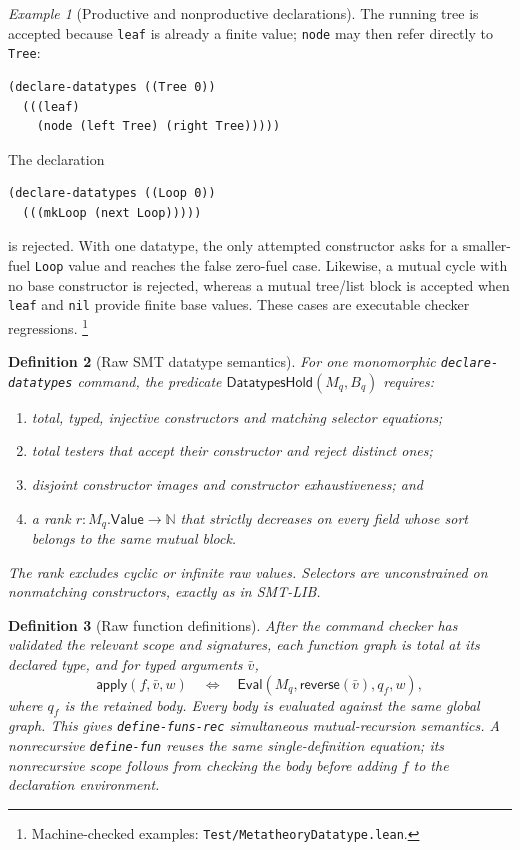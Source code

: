 \documentclass[11pt]{article}
\newtheorem{definition}{Definition}[section]
\theoremstyle{remark}
\newtheorem{example}[definition]{Example}
\begin{document}
\begin{example}[Productive and nonproductive declarations]
The running tree is accepted because \texttt{leaf} is already a finite value;
\texttt{node} may then refer directly to \texttt{Tree}:
\begin{verbatim}
(declare-datatypes ((Tree 0))
  (((leaf)
    (node (left Tree) (right Tree)))))
\end{verbatim}
The declaration
\begin{verbatim}
(declare-datatypes ((Loop 0))
  (((mkLoop (next Loop)))))
\end{verbatim}
is rejected. With one datatype, the only attempted constructor asks for a
smaller-fuel \texttt{Loop} value and reaches the false zero-fuel case. Likewise,
a mutual cycle with no base constructor is rejected, whereas a mutual
tree/list block is accepted when \texttt{leaf} and \texttt{nil} provide finite
base values. These cases are executable checker regressions.
\footnote{Machine-checked examples:
\texttt{Test/MetatheoryDatatype.lean}.}
\end{example}

\begin{definition}[Raw SMT datatype semantics]
For one monomorphic \texttt{declare-datatypes} command, the predicate
$\mathsf{DatatypesHold}(M_q,B_q)$ requires:
\begin{enumerate}[leftmargin=*]
 \item total, typed, injective constructors and matching selector equations;
 \item total testers that accept their constructor and reject distinct ones;
 \item disjoint constructor images and constructor exhaustiveness; and
 \item a rank $r:M_q.\mathsf{Value}\to\mathbb N$ that strictly decreases on
       every field whose sort belongs to the same mutual block.
\end{enumerate}
The rank excludes cyclic or infinite raw values. Selectors are unconstrained on
nonmatching constructors, exactly as in SMT-LIB.
\end{definition}

\begin{definition}[Raw function definitions]
After the command checker has validated the relevant scope and signatures, each
function graph is total at its declared type, and for
typed arguments $\bar v$,
\[
 \mathsf{apply}(f,\bar v,w)
 \quad\Longleftrightarrow\quad
 \mathsf{Eval}(M_q,\mathsf{reverse}(\bar v),q_f,w),
\]
where $q_f$ is the retained body. Every body is evaluated against the same
global graph. This gives \texttt{define-funs-rec} simultaneous
mutual-recursion semantics. A nonrecursive \texttt{define-fun} reuses the same
single-definition equation; its nonrecursive scope follows from checking the
body before adding $f$ to the declaration environment.
\end{definition}
\end{document}
